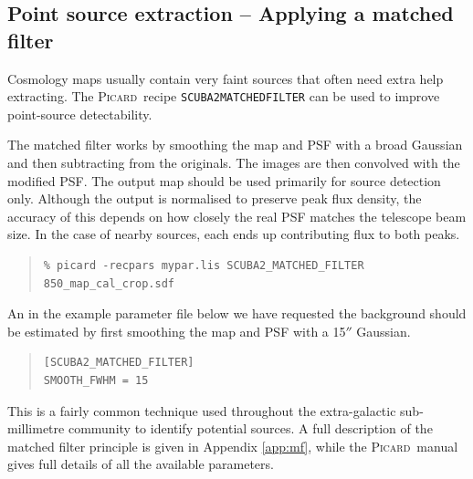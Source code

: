 \documentclass[twoside,11pt]{article}
\newcounter{box}
\newcommand{\xref}[3]{#1}
\newcommand{\xlabel}[1]{}
\renewcommand{\_}{\texttt{\symbol{95}}}
\newenvironment{myquote}{\begin{quote}\begin{small}}{\end{small}\end{quote}}
\newcommand{\gaia}{\xref{\textsc{Gaia}}{sun214}{}}
\newcommand{\picard}{\xref{\textsc{Picard}}{sun265}{}}
\begin{document}


\subsection{\xlabel{match_filter}Point source extraction --  Applying a matched filter}
\label{sec:mf}
Cosmology maps usually contain very faint sources that often need extra help extracting. The \picard\ recipe \texttt{SCUBA2\_MATCHED\_FILTER} can be used to improve point-source detectability.

The matched filter works by smoothing the map and PSF with a broad Gaussian and then subtracting from the originals. The images are then convolved with the modified PSF.  The output map should be used primarily for source detection only. Although the output is normalised to preserve peak flux density, the accuracy of this depends on how closely the real PSF matches the telescope beam size. In the case of nearby sources, each ends up contributing flux to both peaks.

 \begin{myquote}
\begin{verbatim}
% picard -recpars mypar.lis SCUBA2_MATCHED_FILTER 850_map_cal_crop.sdf
\end{verbatim}
\end{myquote}

An in the example parameter file below we have requested the background should be estimated by first smoothing the map and PSF with a 15$''$ Gaussian. 
\begin{myquote}
\begin{verbatim}
[SCUBA2_MATCHED_FILTER]
SMOOTH_FWHM = 15
\end{verbatim}
\end{myquote}
 This is a fairly common technique used throughout the extra-galactic sub-millimetre community to identify potential sources. A full description of the matched filter principle is given in Appendix \ref{app:mf}, while the \picard\ manual gives full details of all the available parameters.
\end{document}
